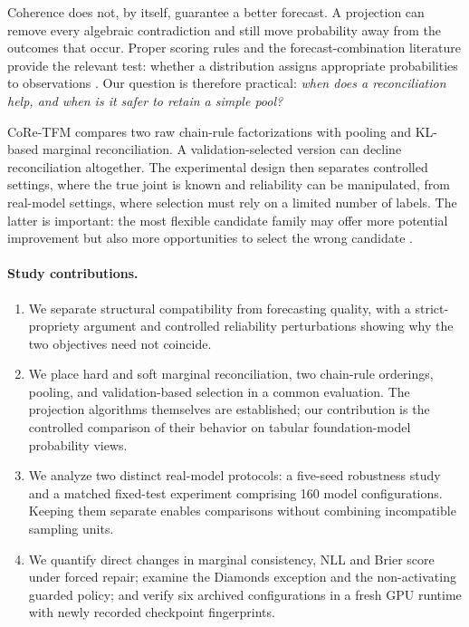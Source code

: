 \documentclass[a4paper,fleqn]{cas-sc}
\begin{document}
Coherence does not, by itself, guarantee a better forecast. A projection can remove every algebraic contradiction and still move probability away from the outcomes that occur. Proper scoring rules and the forecast-combination literature provide the relevant test: whether a distribution assigns appropriate probabilities to observations \citep{brier1950,gneiting2007strictly,gneiting2007calibration,genest1986combining,ranjan2010combining,gneiting2013combining}. Our question is therefore practical: \emph{when does a reconciliation help, and when is it safer to retain a simple pool?}

CoRe-TFM compares two raw chain-rule factorizations with pooling and KL-based marginal reconciliation. A validation-selected version can decline reconciliation altogether. The experimental design then separates controlled settings, where the true joint is known and reliability can be manipulated, from real-model settings, where selection must rely on a limited number of labels. The latter is important: the most flexible candidate family may offer more potential improvement but also more opportunities to select the wrong candidate \citep{cawley2010overfitting}.

\paragraph{Study contributions.}
\begin{enumerate}
\item We separate structural compatibility from forecasting quality, with a strict-propriety argument and controlled reliability perturbations showing why the two objectives need not coincide.
\item We place hard and soft marginal reconciliation, two chain-rule orderings, pooling, and validation-based selection in a common evaluation. The projection algorithms themselves are established; our contribution is the controlled comparison of their behavior on tabular foundation-model probability views.
\item We analyze two distinct real-model protocols: a five-seed robustness study and a matched fixed-test experiment comprising 160 model configurations. Keeping them separate enables comparisons without combining incompatible sampling units.
\item We quantify direct changes in marginal consistency, NLL and Brier score under forced repair; examine the Diamonds exception and the non-activating guarded policy; and verify six archived configurations in a fresh GPU runtime with newly recorded checkpoint fingerprints.
\end{enumerate}
\end{document}
